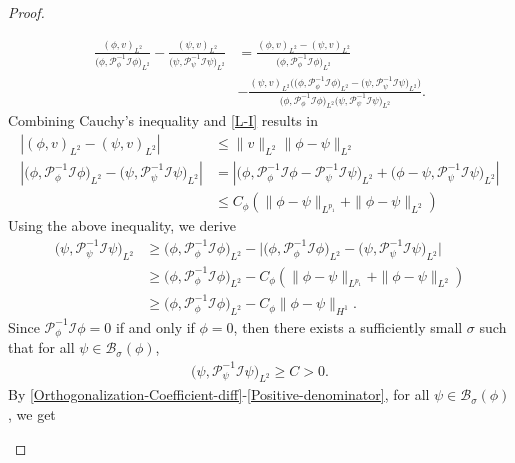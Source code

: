 \documentclass[preprint,3p]{elsarticle}
\begin{document}
\begin{proof}
\begin{itemize}[label={},left=0pt]
\begin{align}
			\nonumber\frac{(\phi,v)_{L^2}}{\big(\phi,\mathcal{P}_{\phi}^{-1}\mathcal{I}\phi\big)_{L^2}}-\frac{(\psi,v)_{L^2}}{\big(\psi,\mathcal{P}_{\psi}^{-1}\mathcal{I}\psi\big)_{L^2}}&=\frac{(\phi,v)_{L^2}-(\psi,v)_{L^2}}{\big(\phi,\mathcal{P}_{\phi}^{-1}\mathcal{I}\phi\big)_{L^2}}\\
			&-\frac{(\psi,v)_{L^2}\big(\big(\phi,\mathcal{P}_{\phi}^{-1}\mathcal{I}\phi\big)_{L^2}-\big(\psi,\mathcal{P}_{\psi}^{-1}\mathcal{I}\psi\big)_{L^2}\big)}{\big(\phi,\mathcal{P}_{\phi}^{-1}\mathcal{I}\phi\big)_{L^2}\big(\psi,\mathcal{P}_{\psi}^{-1}\mathcal{I}\psi\big)_{L^2}}.
		\end{align}
		Combining Cauchy’s inequality and \eqref{L-I} results in
		\begin{align}
			\left|(\phi,v)_{L^2}-(\psi,v)_{L^2}\right|&\le \|v\|_{L^2}\|\phi-\psi\|_{L^2}\\
			\nonumber\left|\big(\phi,\mathcal{P}_{\phi}^{-1}\mathcal{I}\phi\big)_{L^2}-\big(\psi,\mathcal{P}_{\psi}^{-1}\mathcal{I}\psi\big)_{L^2}\right|&=\left|\big(\phi,\mathcal{P}_{\phi}^{-1}\mathcal{I}\phi-\mathcal{P}_{\psi}^{-1}\mathcal{I}\psi\big)_{L^2}+\big(\phi-\psi,\mathcal{P}_{\psi}^{-1}\mathcal{I}\psi\big)_{L^2}\right|\\
			&\le C_{\phi}\left(\|\phi-\psi\|_{L^{p_1}}+\|\phi-\psi\|_{L^2}\right)\label{lamb-denominator-dif}
		\end{align}
		Using the above inequality, we derive
		\begin{align}
			\nonumber\big(\psi,\mathcal{P}_{\psi}^{-1}\mathcal{I}\psi\big)_{L^2}&\ge\big(\phi,\mathcal{P}_{\phi}^{-1}\mathcal{I}\phi\big)_{L^2}-\big|\big(\phi,\mathcal{P}_{\phi}^{-1}\mathcal{I}\phi\big)_{L^2}-\big(\psi,\mathcal{P}_{\psi}^{-1}\mathcal{I}\psi\big)_{L^2}\big|\\
			&\ge\big(\phi,\mathcal{P}_{\phi}^{-1}\mathcal{I}\phi\big)_{L^2}-C_{\phi}\left(\|\phi-\psi\|_{L^{p_1}}+\|\phi-\psi\|_{L^2}\right)\\
			\nonumber&\ge\big(\phi,\mathcal{P}_{\phi}^{-1}\mathcal{I}\phi\big)_{L^2}-C_{\phi}\|\phi-\psi\|_{H^1}.
		\end{align}
		Since $\mathcal{P}_{\phi}^{-1}\mathcal{I}\phi=0$ if and only if $\phi=0$, then there exists a sufficiently small $\sigma$ such that for all $\psi \in \mathcal{B}_{\sigma}(\phi)$,
		\begin{align}\label{Positive-denominator}
			\big(\psi,\mathcal{P}_{\psi}^{-1}\mathcal{I}\psi\big)_{L^2}\ge C>0.
		\end{align} 
		By \eqref{Orthogonalization-Coefficient-diff}-\eqref{Positive-denominator}, for all $\psi \in \mathcal{B}_{\sigma}(\phi)$, we get

\end{itemize}
\end{proof}
\end{document}
